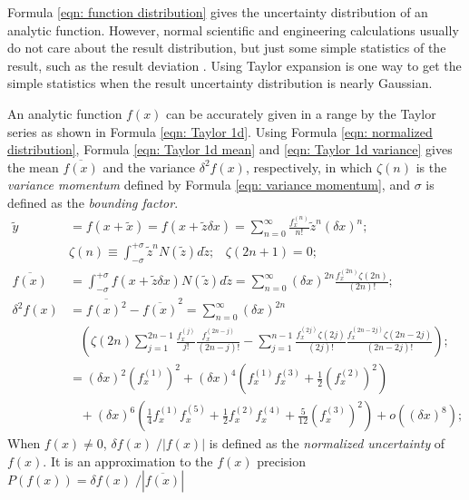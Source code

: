 \documentclass[twoside]{article}
\numberwithin{equation}{section}
\newcommand{\eqspace}{\;\;\;}
\begin{document}
\fi





Formula \eqref{eqn: function distribution} gives the uncertainty distribution of an analytic function.
However, normal scientific and engineering calculations usually do not care about the result distribution, but just some simple statistics of the result, such as the result deviation \cite{Statistical_Methods} \cite{Precisions_Physical_Measurements}.
Using Taylor expansion is one way to get the simple statistics when the result uncertainty distribution is nearly Gaussian.

An analytic function $f(x)$ can be accurately given in a range by the Taylor series as shown in Formula \eqref{eqn: Taylor 1d}.
Using Formula \eqref{eqn: normalized distribution}, Formula \eqref{eqn: Taylor 1d mean} and \eqref{eqn: Taylor 1d variance} \cite{Prev_Precision_Arithmetic} gives the mean $\overline{f(x)}$ and the variance $\delta^2 f(x)$, respectively, in which $\zeta(n)$ is the \emph{variance momentum} defined by Formula \eqref{eqn: variance momentum}, and $\sigma$ is defined as the \emph{bounding factor}.
\begin{align}
\label{eqn: Taylor 1d} 
\tilde{y} &= f(x + \tilde{x}) = f(x + \tilde{z} \delta x) = \sum_{n=0}^{\infty} \frac{f^{(n)}_x}{n!} \tilde{z}^n (\delta x)^n; \\
\label{eqn: variance momentum}
& \zeta(n) \equiv \int_{-\sigma}^{+\sigma} \tilde{z}^n N(\tilde{z}) d \tilde{z};\eqspace \zeta(2n+1) = 0; \\
\label{eqn: Taylor 1d mean}
\overline{f(x)} &= \int_{-\sigma}^{+\sigma} f(x + \tilde{z} \delta x) N(\tilde{z}) d \tilde{z}
  = \sum_{n=0}^{\infty}(\delta x)^{2n} \frac{f^{(2n)}_x \zeta(2n)}{(2n)!}; \\
\delta^2 f(x) &= \overline{f(x)^2} - \overline{f(x)}^2 = \sum_{n=0}^{\infty} (\delta x)^{2n}  \nonumber \\
\label{eqn: Taylor 1d variance}
&\eqspace \left( \zeta(2n) \sum_{j=1}^{2n-1} \frac{f^{(j)}_x}{j!} \frac{f^{(2n-j)}_x}{(2n-j)!} - 
 	\sum_{j=1}^{n-1} \frac{f^{(2j)}_x \zeta(2j)}{(2j)!} \frac{f^{(2n-2j)}_x \zeta(2n - 2j)}{(2n-2j)!} \right); \\
  &= (\delta x)^2 (f^{(1)}_x)^2 + (\delta x)^4 \left(f^{(1)}_x f^{(3)}_x + \frac{1}{2} (f^{(2)}_x)^2 \right) \nonumber \\
  &\eqspace + (\delta x)^6 \left(\frac{1}{4} f^{(1)}_x f^{(5)}_x + \frac{1}{2} f^{(2)}_x f^{(4)}_x + \frac{5}{12} (f^{(3)}_x)^2 \right) + o((\delta x)^8);
\end{align}
When $f(x) \neq 0$, $\delta f(x) \;/|f(x)|$ is defined as the \emph{normalized uncertainty} of $f(x)$.  
It is an approximation to the $f(x)$ precision $P(f(x)) = \delta f(x) \;/|\overline{f(x)}|$
\end{document}
